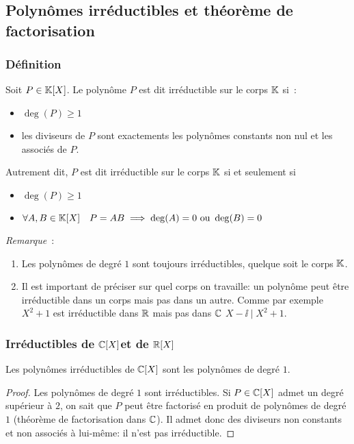 \subsection{Polynômes irréductibles et théorème de factorisation}

\subsubsection{Définition}

\begin{defdef}
  Soit \(P \in \mathbb{K}[X]\). Le polynôme \(P\) est dit irréductible sur le corps 
  \(\mathbb{K}\) si~:
  \begin{itemize}
    \item \(\deg(P) \geqslant 1\)
    \item les diviseurs de \(P\) sont exactements les polynômes constants non 
      nul et les associés de \(P\).
  \end{itemize}
  Autrement dit, \(P\) est dit irréductible sur le corps \(\mathbb{K}\) si et seulement 
  si
  \begin{itemize}
    \item \(\deg(P) \geqslant 1\)
    \item \(\forall A,B \in \mathbb{K}[X] \quad P = AB \implies \deg(A) = 0 \text{~ou~} 
      \deg(B) = 0\)
  \end{itemize}
\end{defdef}

\emph{Remarque}~:
\begin{enumerate}
  \item Les polynômes de degré \(1\) sont toujours irréductibles, quelque soit 
    le corps \(\mathbb{K}\).
  \item Il est important de préciser sur quel corps on travaille: un polynôme 
    peut être irréductible dans un corps mais pas dans un autre. Comme par 
    exemple \(X^2+1\) est irréductible dans \(\mathbb{R}\) mais pas dans \(\mathbb{C}\) 
    \(X-\ii\mid{}X^2+1\).
\end{enumerate}

\subsubsection{Irréductibles de \(\mathbb{C}[X]\)et de \(\mathbb{R}[X]\)}

\begin{prop}
  Les polynômes irréductibles de \(\mathbb{C}[X]\) sont les polynômes de degré \(1\).
\end{prop}
\begin{proof}
  Les polynômes de degré \(1\) sont irréductibles. Si \(P\in \mathbb{C}[X]\) admet un 
  degré supérieur à \(2\), on sait que \(P\) peut être factorisé en produit de 
  polynômes de degré \(1\) (théorème de factorisation dans \(\mathbb{C}\)). Il admet 
  donc des diviseurs non constants et non associés à lui-même: il n'est pas 
  irréductible.
\end{proof}

